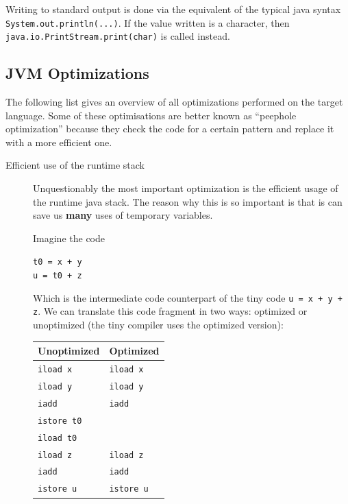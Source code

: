 \documentclass[a4paper]{article}
\begin{document}
Writing to standard output is done via the equivalent of the typical java
syntax \texttt{System.out.println(...)}. If the value written is a character,
then\\ \texttt{java.io.PrintStream.print(char)} is called instead.

\subsection{JVM Optimizations}

The following list gives an overview of all optimizations performed on the
target language. Some of these optimisations are better known as ``peephole
optimization'' because they check the code for a certain pattern and replace
it with a more efficient one.

\begin{description}
\item[Efficient use of the runtime stack]
Unquestionably the most important optimization is the efficient usage of the
runtime java stack. The reason why this is so important is that is can save us
\textbf{many} uses of temporary variables.

Imagine the code
\begin{center}
\texttt{t0 = x + y}\\
\texttt{u = t0 + z}\\
\end{center}

Which is the intermediate code counterpart of the tiny code \texttt{u = x + y
+ z}. We can translate this code fragment in two ways: optimized or
unoptimized (the tiny compiler uses the optimized version):
\begin{center}
\begin{tabular}{|l|l|}
\hline
Unoptimized & Optimized \\
\hline
\texttt{iload x}  & \texttt{iload x}\\
\texttt{iload y}  & \texttt{iload y}\\
\texttt{iadd}     & \texttt{iadd}\\
\texttt{istore t0}& \\
\texttt{iload t0} & \\
\texttt{iload z}  & \texttt{iload z}\\
\texttt{iadd}     & \texttt{iadd}\\
\texttt{istore u} & \texttt{istore u}\\
\hline
\end{tabular}
\end{center}


\end{description}
\end{document}
